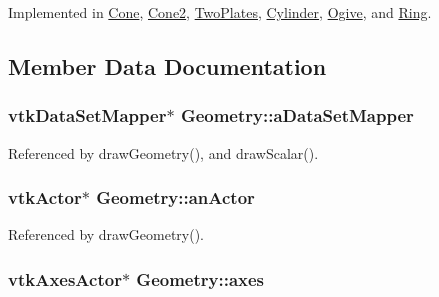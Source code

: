 Implemented in \hyperlink{classCone_a52fd80b6c484449a8d24d1471e21873c}{Cone}, \hyperlink{classCone2_a7aeaee918b84b78b5b00f9572bedd349}{Cone2}, \hyperlink{classTwoPlates_a23168c87f9097b2c1a4fa8cac4b61049}{Two\-Plates}, \hyperlink{classCylinder_ad75a4b81272ef8b27b3163bf0aa49efd}{Cylinder}, \hyperlink{classOgive_a925beac2c2c2ee5f7ad6654a4f1048e5}{Ogive}, and \hyperlink{classRing_a4e11fdcade67b41f38a7ec4458afdd8d}{Ring}.



\subsection{Member Data Documentation}
\hypertarget{classGeometry_af314d57676056969da57788a60954926}{
\subsubsection[{a\-Data\-Set\-Mapper}]{\setlength{\rightskip}{0pt plus 5cm}vtk\-Data\-Set\-Mapper$\ast$ Geometry\-::a\-Data\-Set\-Mapper\hspace{0.3cm}{\ttfamily [protected]}}}\label{classGeometry_af314d57676056969da57788a60954926}


Referenced by draw\-Geometry(), and draw\-Scalar().

\hypertarget{classGeometry_a86a213e57fee0c578d220d8015c2891b}{
\subsubsection[{an\-Actor}]{\setlength{\rightskip}{0pt plus 5cm}vtk\-Actor$\ast$ Geometry\-::an\-Actor\hspace{0.3cm}{\ttfamily [protected]}}}\label{classGeometry_a86a213e57fee0c578d220d8015c2891b}


Referenced by draw\-Geometry().

\hypertarget{classGeometry_a17c7a286dc0a428e8a32db4c8d54bb5e}{
\subsubsection[{axes}]{\setlength{\rightskip}{0pt plus 5cm}vtk\-Axes\-Actor$\ast$ Geometry\-::axes\hspace{0.3cm}{\ttfamily [protected]}}}\label{classGeometry_a17c7a286dc0a428e8a32db4c8d54bb5e}


